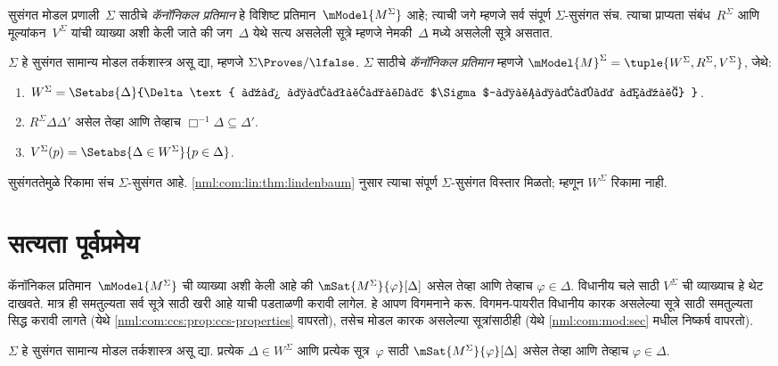 सुसंगत मोडल प्रणाली~$\Sigma$ साठीचे \emph{कॅनॉनिकल प्रतिमान}
हे विशिष्ट प्रतिमान~$\mModel{M^\Sigma}$ आहे; त्याची
जगे म्हणजे सर्व संपूर्ण $\Sigma$-सुसंगत संच.
त्याचा प्राप्यता संबंध~$R^\Sigma$ आणि
मूल्यांकन~$V^\Sigma$ यांची व्याख्या अशी केली
जाते की जग~$\Delta$ येथे सत्य असलेली
सूत्रे म्हणजे नेमकी~$\Delta$ मध्ये
असलेली सूत्रे असतात.

\begin{defn}
  $\Sigma$ हे सुसंगत सामान्य मोडल तर्कशास्त्र असू द्या,
  म्हणजे $\Sigma \Proves/ \lfalse$.
  $\Sigma$ साठीचे \emph{कॅनॉनिकल प्रतिमान}
  म्हणजे $\mModel{M}^\Sigma = \tuple{W^\Sigma, R^\Sigma,
    V^\Sigma}$, जेथे:
  \begin{enumerate}
  \item $W^\Sigma = \Setabs{ \Delta }{\Delta \text{
      हा संपूर्ण $\Sigma$-सुसंगत आहे} }$.
  \item $R^\Sigma \Delta\Delta'$ असेल तेव्हा आणि
    तेव्हाच $\Box^{-1}\Delta \subseteq
      \Delta'$.
  \item $V^\Sigma(p) = \Setabs{\Delta \in W^\Sigma}{p \in \Delta}$.
  \end{enumerate}
  सुसंगततेमुळे रिकामा संच $\Sigma$-सुसंगत आहे.
  \ref{nml:com:lin:thm:lindenbaum} नुसार त्याचा संपूर्ण
  $\Sigma$-सुसंगत विस्तार मिळतो; म्हणून $W^\Sigma$ रिकामा नाही.
\end{defn}














\section{सत्यता पूर्वप्रमेय}\label{nml:com:tru:sec}

कॅनॉनिकल प्रतिमान~$\mModel{M^\Sigma}$ ची व्याख्या
अशी केली आहे की $\mSat{M^\Sigma}{\varphi}[\Delta]$
असेल तेव्हा आणि तेव्हाच $\varphi \in \Delta$.
विधानीय चले साठी
$V^\Sigma$ ची व्याख्याच हे थेट दाखवते.
मात्र ही समतुल्यता सर्व सूत्रे साठी
खरी आहे याची पडताळणी करावी लागेल.
हे आपण विगमनाने करू. विगमन-पायरीत
विधानीय कारक असलेल्या सूत्रे साठी
समतुल्यता सिद्ध करावी लागते (येथे
\ref{nml:com:ccs:prop:ccs-properties} वापरतो),
तसेच मोडल कारक असलेल्या सूत्रांसाठीही
(येथे \ref{nml:com:mod:sec} मधील निष्कर्ष वापरतो).

\begin{prop}[सत्यता पूर्वप्रमेय]
  \label{nml:com:tru:prop:truthlemma}
  $\Sigma$ हे सुसंगत सामान्य मोडल तर्कशास्त्र असू द्या.
  प्रत्येक $\Delta \in W^\Sigma$ आणि प्रत्येक सूत्र~$\varphi$ साठी
  $\mSat{M^\Sigma}{\varphi}[\Delta]$ असेल तेव्हा
  आणि तेव्हाच $\varphi \in \Delta$.
\end{prop}

